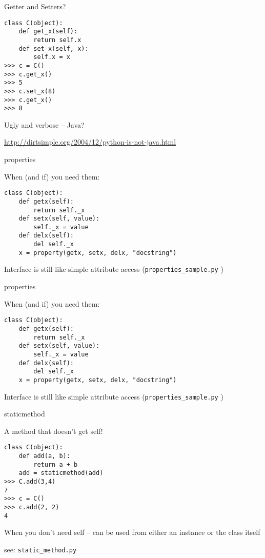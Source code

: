 \documentclass{beamer}
\begin{document}
\begin{frame}[fragile]{Getter and Setters?}

\begin{verbatim}
class C(object):
    def get_x(self):
        return self.x
    def set_x(self, x):
        self.x = x
>>> c = C()
>>> c.get_x()
>>> 5
>>> c.set_x(8)
>>> c.get_x()
>>> 8
\end{verbatim}
{\Large Ugly and verbose -- Java?}

\url{http://dirtsimple.org/2004/12/python-is-not-java.html}

\end{frame} 

\begin{frame}[fragile]{properties}

{ \Large When (and if) you need them: }

\begin{verbatim}
class C(object):
    def getx(self):
        return self._x
    def setx(self, value):
        self._x = value
    def delx(self):
        del self._x
    x = property(getx, setx, delx, "docstring")
\end{verbatim}
{\Large Interface is still like simple attribute access}
(\verb|properties_sample.py| )
\end{frame} 


\begin{frame}[fragile]{properties}

{ \Large When (and if) you need them: }

\begin{verbatim}
class C(object):
    def getx(self):
        return self._x
    def setx(self, value):
        self._x = value
    def delx(self):
        del self._x
    x = property(getx, setx, delx, "docstring")
\end{verbatim}
{\Large Interface is still like simple attribute access}
(\verb|properties_sample.py| )
\end{frame} 

\begin{frame}[fragile]{staticmethod}

{ \Large A method that doesn't get self! }

\begin{verbatim}
class C(object):
    def add(a, b):
        return a + b
    add = staticmethod(add)
>>> C.add(3,4)
7
>>> c = C()
>>> c.add(2, 2)
4
\end{verbatim}
{\Large When you don't need self -- can be used from either an instance or the class itself}

\vfill
see: \verb|static_method.py|
\end{frame} 
\end{document}

